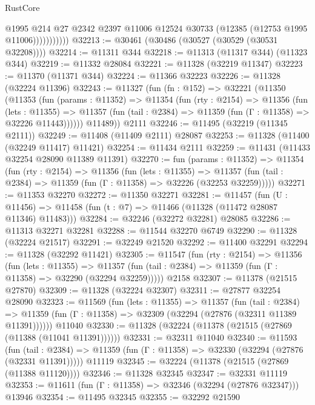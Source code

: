 \begin{lexlean}{RustCore}
\begin{coremodule}
                      @1995
                      @214
                      @27
                      @2342
                      @2397
                      @11006
                      @12524
                      @30733
                      (@12385 (@12753 @1995 @11006)))))))))))
@32213 := @30461 (@30486 (@30527 (@30529 (@30531 @32208))))
@32214 := @11311 @344
@32218 := @11313 (@11317 @344) (@11323 @344)
@32219 := @11332 @28084
@32221 := @11328 (@32219 @11347)
@32223 := @11370 (@11371 @344)
@32224 := @11366 @32223
@32226 := @11328 (@32224 @11396)
@32243 := @11327
    (fun (fn : @152) =>
    @32221
      (@11350
        (@11353
          (fun (params : @11352) =>
          @11354
            (fun (rty : @2154) =>
            @11356
              (fun (lets : @11355) =>
              @11357 (fun (tail : @2384) => @11359 (fun (Γ : @11358) => @32226 @11443))))))
        @11489))
    @2111
@32246 := @11495 (@32219 (@11345 @2111))
@32249 := @11408 (@11409 @2111) @28087
@32253 := @11328 (@11400 (@32249 @11417) @11421)
@32254 := @11434 @2111
@32259 := @11431 (@11433 @32254 @28090 @11389 @11391)
@32270 := fun (params : @11352) =>
  @11354
    (fun (rty : @2154) =>
    @11356
      (fun (lets : @11355) =>
      @11357 (fun (tail : @2384) => @11359 (fun (Γ : @11358) => @32226 (@32253 @32259)))))
@32271 := @11353 @32270
@32272 := @11350 @32271
@32281 := @11457
    (fun (U : @11456) => @11458 (fun (t : @7) => @11466 (@11328 (@11472 @28087 @11346) @11483)))
@32284 := @32246 (@32272 @32281) @28085
@32286 := @11313 @32271 @32281
@32288 := @11544 @32270 @6749
@32290 := @11328 (@32224 @21517)
@32291 := @32249 @21520
@32292 := @11400 @32291
@32294 := @11328 (@32292 @11421)
@32305 := @11547
    (fun (rty : @2154) =>
    @11356
      (fun (lets : @11355) =>
      @11357 (fun (tail : @2384) => @11359 (fun (Γ : @11358) => @32290 (@32294 @32259)))))
    @2158
@32307 := @11378 (@21515 @27870)
@32309 := @11328 (@32224 @32307)
@32311 := @27877 @32254 @28090
@32323 := @11569
    (fun (lets : @11355) =>
    @11357
      (fun (tail : @2384) =>
      @11359 (fun (Γ : @11358) => @32309 (@32294 (@27876 (@32311 @11389 @11391))))))
    @11040
@32330 := @11328 (@32224 (@11378 (@21515 (@27869 (@11388 (@11041 @11391))))))
@32331 := @32311 @11040
@32340 := @11593
    (fun (tail : @2384) => @11359 (fun (Γ : @11358) => @32330 (@32294 (@27876 (@32331 @11391)))))
    @11119
@32345 := @32224 (@11378 (@21515 (@27869 (@11388 @11120))))
@32346 := @11328 @32345
@32347 := @32331 @11119
@32353 := @11611 (fun (Γ : @11358) => @32346 (@32294 (@27876 @32347))) @13946
@32354 := @11495 @32345
@32355 := @32292 @21590

\end{coremodule}
\end{lexlean}

